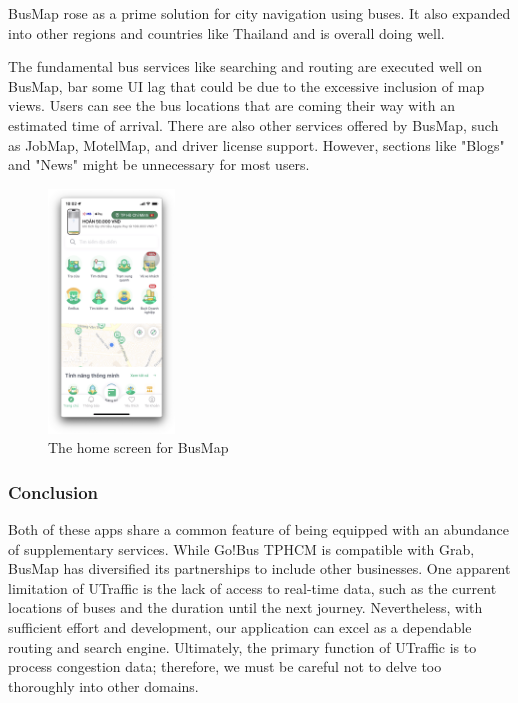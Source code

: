 BusMap rose as a prime solution for city navigation using buses. It also expanded into other regions and countries like Thailand and is overall doing well.

The fundamental bus services like searching and routing are executed well on BusMap, bar some UI lag that could be due to the excessive inclusion of map views. Users can see the bus locations that are coming their way with an estimated time of arrival. There are also other services offered by BusMap, such as JobMap, MotelMap, and driver license support. However, sections like "Blogs" and "News" might be unnecessary for most users.

\begin{figure}[H]
    \centering
    \includegraphics[width=0.3\textwidth]{assets/images/Research/Bus/busmap_home.png}
    \caption{The home screen for BusMap}
    \label{fig:busmap_homescreen}
\end{figure}

\subsubsection{Conclusion}

Both of these apps share a common feature of being equipped with an abundance of supplementary services. While Go!Bus TPHCM is compatible with Grab, BusMap has diversified its partnerships to include other businesses. One apparent limitation of UTraffic is the lack of access to real-time data, such as the current locations of buses and the duration until the next journey. Nevertheless, with sufficient effort and development, our application can excel as a dependable routing and search engine. Ultimately, the primary function of UTraffic is to process congestion data; therefore, we must be careful not to delve too thoroughly into other domains.


